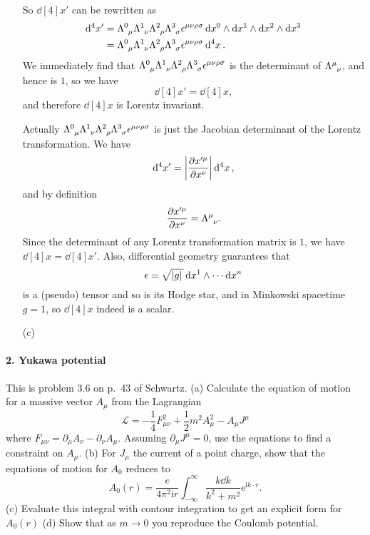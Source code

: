 \documentclass[hyperref, a4paper]{article}
\newcommand*{\ii}{\mathrm{i}}
\newcommand*{\ee}{\mathrm{e}}
\begin{document}
\begin{itemize}
\[    \]
    So $\dd[4]{x'}$ can be rewritten as 
    \[
        \begin{aligned}
            \dd[4]{x'} &= \Lambda\indices{^0_\mu} \Lambda\indices{^1_\nu} \Lambda\indices{^2_\rho} \Lambda\indices{^3_\sigma} \epsilon^{\mu \nu \rho \sigma} \dd{x^0} \wedge \dd{x^1} \wedge \dd{x^2} \wedge \dd{x^3} \\
            &= \Lambda\indices{^0_\mu} \Lambda\indices{^1_\nu} \Lambda\indices{^2_\rho} \Lambda\indices{^3_\sigma} \epsilon^{\mu \nu \rho \sigma} \dd[4]{x}.
        \end{aligned}
    \]
    We immediately find that $\Lambda\indices{^0_\mu} \Lambda\indices{^1_\nu} \Lambda\indices{^2_\rho} \Lambda\indices{^3_\sigma} \epsilon^{\mu \nu \rho \sigma}$ is the determinant of $\Lambda\indices{^\mu_\nu}$, and hence is $1$, so we have
    \[
        \dd[4]{x'} = \dd[4]{x},
    \]
    and therefore $\dd[4]{x}$ is Lorentz invariant.

    Actually $\Lambda\indices{^0_\mu} \Lambda\indices{^1_\nu} \Lambda\indices{^2_\rho} \Lambda\indices{^3_\sigma} \epsilon^{\mu \nu \rho \sigma}$ is just the Jacobian determinant of the Lorentz transformation.
    We have
    \[
        \dd[4]{x'} = \abs{\pdv{x'^\mu}{x^\nu}} \dd[4]{x},
    \]
    and by definition 
    \[
        \pdv{x'^\mu}{x^\nu} = \Lambda\indices{^\mu_\nu}.    
    \]
    Since the determinant of any Lorentz transformation matrix is $1$, we have $\dd[4]{x} = \dd[4]{x'}$.
    Also, differential geometry guarantees that 
    \[
        \epsilon = \sqrt{\abs*{g}} \dd{x^1} \wedge \cdots \dd{x^n}
    \]
    is a (pseudo) tensor and so is its Hodge star, and in Minkowski spacetime $g = 1$, so $\dd[4]{x}$ indeed is a scalar. 
    \item[(c)] 
\end{itemize}

\paragraph{2. Yukawa potential} This is problem $3.6$ on p.~43 of Schwartz.
(a) Calculate the equation of motion for a massive vector $A_{\mu}$ from the Lagrangian
\[
\mathcal{L}=-\frac{1}{4} F_{\mu \nu}^{2}+\frac{1}{2} m^{2} A_{\mu}^{2}-A_{\mu} J^{\mu}
\]
where $F_{\mu \nu}=\partial_{\mu} A_{\nu}-\partial_{\nu} A_{\mu}$. Assuming $\partial_{\mu} J^{\mu}=0$, use the equations to find a constraint on $A_{\mu}$.
(b) For $J_{\mu}$ the current of a point charge, show that the equations of motion for $A_{0}$ reduces to
\[
A_{0}(r)=\frac{e}{4 \pi^{2} \ii r} \int_{-\infty}^{\infty} \frac{k \dd k}{k^{2}+m^{2}} \ee^{\ii k \cdot r}.
\]
(c) Evaluate this integral with contour integration to get an explicit form for $A_{0}(r)$
(d) Show that as $m \rightarrow 0$ you reproduce the Coulomb potential.
\end{document}
